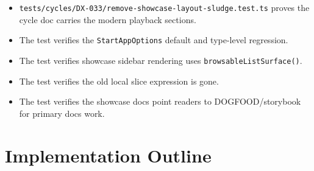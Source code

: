 \begin{itemize}
\tightlist
\item
  \texttt{t\allowbreak{}e\allowbreak{}s\allowbreak{}t\allowbreak{}s\allowbreak{}/\allowbreak{}c\allowbreak{}y\allowbreak{}c\allowbreak{}l\allowbreak{}e\allowbreak{}s\allowbreak{}/\allowbreak{}D\allowbreak{}X\allowbreak{}-\allowbreak{}0\allowbreak{}3\allowbreak{}3\allowbreak{}/\allowbreak{}r\allowbreak{}e\allowbreak{}m\allowbreak{}o\allowbreak{}v\allowbreak{}e\allowbreak{}-\allowbreak{}s\allowbreak{}h\allowbreak{}o\allowbreak{}w\allowbreak{}c\allowbreak{}a\allowbreak{}s\allowbreak{}e\allowbreak{}-\allowbreak{}l\allowbreak{}a\allowbreak{}y\allowbreak{}o\allowbreak{}u\allowbreak{}t\allowbreak{}-\allowbreak{}s\allowbreak{}l\allowbreak{}u\allowbreak{}d\allowbreak{}g\allowbreak{}e\allowbreak{}.\allowbreak{}t\allowbreak{}e\allowbreak{}s\allowbreak{}t\allowbreak{}.\allowbreak{}t\allowbreak{}s} proves the cycle doc carries the modern playback sections.
\item
  The test verifies the \texttt{S\allowbreak{}t\allowbreak{}a\allowbreak{}r\allowbreak{}t\allowbreak{}A\allowbreak{}p\allowbreak{}p\allowbreak{}O\allowbreak{}p\allowbreak{}t\allowbreak{}i\allowbreak{}o\allowbreak{}n\allowbreak{}s} default and type-level regression.
\item
  The test verifies showcase sidebar rendering uses \texttt{b\allowbreak{}r\allowbreak{}o\allowbreak{}w\allowbreak{}s\allowbreak{}a\allowbreak{}b\allowbreak{}l\allowbreak{}e\allowbreak{}L\allowbreak{}i\allowbreak{}s\allowbreak{}t\allowbreak{}S\allowbreak{}u\allowbreak{}r\allowbreak{}f\allowbreak{}a\allowbreak{}c\allowbreak{}e\allowbreak{}(\allowbreak{})}.
\item
  The test verifies the old local slice expression is gone.
\item
  The test verifies the showcase docs point readers to DOGFOOD/storybook for primary docs work.
\end{itemize}

\section{Implementation Outline}\label{record-131-implementation-outline}

